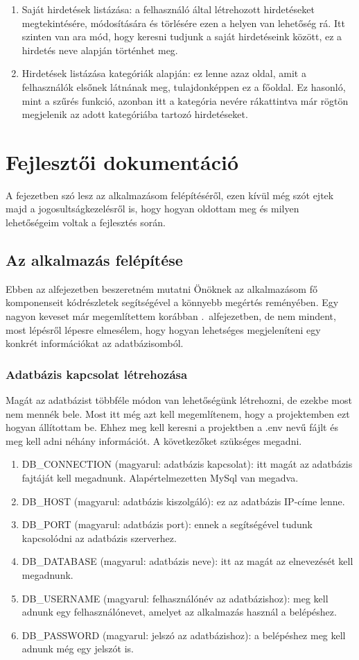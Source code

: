 \documentclass[]{thesis-ekf}
\theoremstyle{definition}
\theoremstyle{remark}
\begin{document}
\begin{enumerate}
			\item Saját hirdetések listázása: a felhasználó által létrehozott hirdetéseket megtekintésére, módosítására és törlésére ezen a helyen van lehetőség rá. Itt szinten van ara mód, hogy keresni tudjunk a saját hirdetéseink között, ez a hirdetés neve alapján történhet meg.
			\item Hirdetések listázása kategóriák alapján: ez lenne azaz oldal, amit a felhasználók elsőnek látnának meg, tulajdonképpen ez a főoldal. Ez hasonló, mint a szűrés funkció, azonban itt a kategória nevére rákattintva már rögtön megjelenik az adott kategóriába tartozó hirdetéseket.
		\end{enumerate}
	
	\chapter{Fejlesztői dokumentáció}
		A fejezetben szó lesz az alkalmazásom felépítéséről, ezen kívül még szót ejtek majd a jogosultságkezelésről is, hogy hogyan oldottam meg és milyen lehetőségeim voltak a fejlesztés során.
	\section{Az alkalmazás felépítése}
		Ebben az alfejezetben beszeretném mutatni Önöknek az alkalmazásom fő komponenseit kódrészletek segítségével a könnyebb megértés reményében. Egy nagyon keveset már megemlítettem korábban .~alfejezetben, de nem mindent, most lépésről lépesre elmesélem, hogy hogyan lehetséges megjeleníteni egy konkrét információkat az adatbázisomból.
	\subsection{Adatbázis kapcsolat létrehozása}
		Magát az adatbázist többféle módon van lehetőségünk létrehozni, de ezekbe most nem mennék bele. Most itt még azt kell megemlítenem, hogy a projektemben ezt hogyan állítottam be. Ehhez meg kell keresni a projektben a .env nevű fájlt és meg kell adni néhány információt. A következőket szükséges megadni.
		\begin{enumerate}
			\item DB\_CONNECTION (magyarul: adatbázis kapcsolat): itt magát az adatbázis fajtáját kell megadnunk. Alapértelmezetten MySql van megadva. 
			\item DB\_HOST (magyarul: adatbázis kiszolgáló): ez az adatbázis IP-címe lenne.
			\item DB\_PORT (magyarul: adatbázis port): ennek a segítségével tudunk kapcsolódni az adatbázis szerverhez. 
			\item DB\_DATABASE (magyarul: adatbázis neve): itt az magát az elnevezését kell megadnunk.
			\item DB\_USERNAME (magyarul: felhasználónév az adatbázishoz): meg kell adnunk egy felhasználónevet, amelyet az alkalmazás használ a belépéshez.
			\item DB\_PASSWORD (magyarul: jelszó az adatbázishoz): a belépéshez meg kell adnunk még egy jelszót is.
		\end{enumerate}
\end{document}
